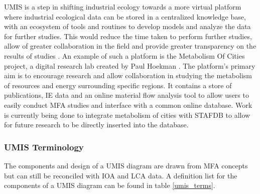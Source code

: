 \documentclass[ %
                    author={Tom Jager},
                supervisor={Dr. Daniel Schien},
                    degree={MEng},
                     title={A Bayesian Inference Engine for UMIS Structured Data},
                  subtitle={},
                      type={research},
                      year={2019} ]{dissertation}
\begin{document}
UMIS is a step in shifting industrial ecology towards a more virtual platform where industrial ecological data can be stored in a centralized knowledge base, with an ecosystem of tools and routines to develop models and analyze the data for further studies. This would reduce the time taken to perform further studies, allow of greater collaboration in the field and provide greater transparency on the results of studies \cite{hertwich2018nullius}. An example of such a platform is the Metabolism Of Cities project, a digital research lab created by Paul Hoekman \cite{MetabolismOfCities}. The platform's primary aim is to encourage research and allow collaboration in studying the metabolism of resources and energy surrounding specific regions. It contains a store of publications, IE data and an online material flow analysis tool to allow users to easily conduct MFA studies and interface with a common online database. Work is currently being done to integrate metabolism of cities with STAFDB to allow for future research to be directly inserted into the database. 

\subsubsection{UMIS Terminology}
The components and design of a UMIS diagram are drawn from MFA concepts but can still be reconciled with IOA and LCA data. A definition list for the components of a UMIS diagram can be found in table \ref{umis_terms}.
\end{document}
